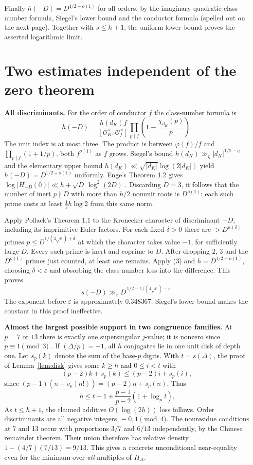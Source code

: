 \documentclass[11pt,letterpaper]{article}
\newcommand{\heading}[1]{\textbf{\color{ink}#1}}
\begin{document}
Finally $h(-D)=D^{1/2+o(1)}$ for all orders, by the imaginary quadratic class-number formula, Siegel's lower bound and the conductor formula (spelled out on the next page). Together with $s\le h+1$, the uniform lower bound proves the asserted logarithmic limit.
\clearpage
\section{Two estimates independent of the zero theorem}
\heading{All discriminants.} For the order of conductor $f$ the class-number formula is
\[
 h(-D)=\frac{h(d_K)f}{[\mathcal O_K^\times:\mathcal O_f^\times]}
              \prod_{p\mid f}\left(1-\frac{\chi_{d_K}(p)}p\right).
\]
The unit index is at most three. The product is between $\varphi(f)/f$ and $\prod_{p\mid f}(1+1/p)$, both $f^{o(1)}$ as $f$ grows. Siegel's bound $h(d_K)\gg_\eta |d_K|^{1/2-\eta}$ and the elementary upper bound $h(d_K)\ll\sqrt{|d_K|}\log(2|d_K|)$ yield $h(-D)=D^{1/2+o(1)}$ uniformly. Enge's Theorem 1.2 gives $\log |H_{-D}(0)|\ll h+\sqrt D\,\log^2(2D)$ \cite{enge}. Discarding $D=3$, it follows that the number of inert $p\nmid D$ with more than $h/2$ nonunit roots is $D^{o(1)}$: each such prime costs at least $\frac12 h\log2$ from this same norm.

Apply Pollack's Theorem 1.1 \cite{pollack} to the Kronecker character of discriminant $-D$, including its imprimitive Euler factors. For each fixed $\delta>0$ there are $>D^{\kappa(\delta)}$ primes $p\le D^{1/(4\sqrt e)+\delta}$ at which the character takes value $-1$, for sufficiently large $D$. Every such prime is inert and coprime to $D$. After dropping 2, 3 and the $D^{o(1)}$ primes just counted, at least one remains. Apply (3) and $h=D^{1/2+o(1)}$, choosing $\delta<\varepsilon$ and absorbing the class-number loss into the difference. This proves
\[
      s(-D)\gg_\varepsilon D^{\,1/2-1/(4\sqrt e)-\varepsilon}.
\]
The exponent before $\varepsilon$ is approximately $0.348367$. Siegel's lower bound makes the constant in this proof ineffective.

\heading{Almost the largest possible support in two congruence families.}
At $p=7$ or $13$ there is exactly one supersingular $j$-value; it is nonzero since $p\equiv1\pmod3$ \cite{deuring}. If $(\Delta/p)=-1$, all $h$ conjugates lie in one unit disk of depth one. Let $s_p(k)$ denote the sum of the base-$p$ digits. With $t=s(\Delta)$, the proof of Lemma~\ref{lem:disk} gives some $k\ge h$ and $0\le i<t$ with
\[
 (p-2)k+s_p(k)\le(p-2)i+s_p(i),
\]
since $(p-1)(n-v_p(n!))=(p-2)n+s_p(n)$. Thus
\[
 h\le t-1+\frac{p-1}{p-2}(1+\log_p t).
\]
As $t\le h+1$, the claimed additive $O(\log(2h))$ loss follows. Order discriminants are all negative integers $\equiv0,1\pmod4$. The nonresidue conditions at 7 and 13 occur with proportions $3/7$ and $6/13$ independently, by the Chinese remainder theorem. Their union therefore has relative density $1-(4/7)(7/13)=9/13$. This gives a concrete unconditional near-equality even for the minimum over \emph{all} multiples of $H_\Delta$.
\clearpage

\clearpage

\clearpage

\clearpage
\end{document}
